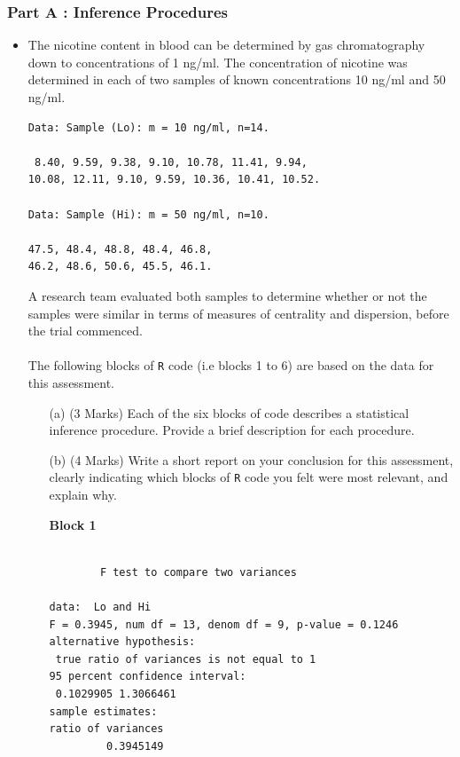 \documentclass[a4paper,12pt]{article}
\begin{document}
\subsubsection*{Part A : Inference Procedures}
\begin{itemize}
\item The nicotine content in blood can be determined by gas chromatography down to concentrations of 1 ng/ml. The concentration of nicotine was determined in each of two samples of known concentrations 10 ng/ml and 50 ng/ml.
\begin{framed}
\begin{verbatim}
Data: Sample (Lo): m = 10 ng/ml, n=14.

 8.40, 9.59, 9.38, 9.10, 10.78, 11.41, 9.94, 
10.08, 12.11, 9.10, 9.59, 10.36, 10.41, 10.52.

Data: Sample (Hi): m = 50 ng/ml, n=10.

47.5, 48.4, 48.8, 48.4, 46.8, 
46.2, 48.6, 50.6, 45.5, 46.1.
\end{verbatim}
\end{framed}
A research team evaluated both samples to determine whether or not the samples were similar in terms of measures of centrality and dispersion, before the trial commenced.  \\  \\ The following blocks of \texttt{R} code (i.e blocks 1 to 6) are based on the data for this assessment. \\ 
\begin{itemize}
\item[(a)] (3 Marks) Each of the six blocks of code describes a statistical inference procedure. Provide a brief description for each procedure.
\item[(b)] (4 Marks) Write a short report on your conclusion for this assessment, clearly indicating which blocks of \texttt{R} code you felt were most relevant, and explain why. 
\end{itemize}

\begin{itemize}
\item[\textbf{Block 1}]
\begin{framed}
\begin{verbatim}

        F test to compare two variances

data:  Lo and Hi
F = 0.3945, num df = 13, denom df = 9, p-value = 0.1246
alternative hypothesis: 
 true ratio of variances is not equal to 1
95 percent confidence interval:
 0.1029905 1.3066461
sample estimates:
ratio of variances 
         0.3945149
\end{verbatim}
\end{framed}


\end{itemize}
\end{itemize}
\end{document}
